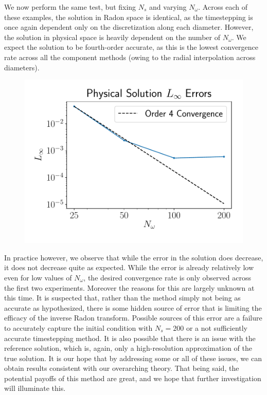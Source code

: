 We now perform the same test, but fixing $N_s$ and varying $N_\omega$.
Across each of these examples, the solution in Radon space is identical, as the timestepping is once again dependent only on the discretization along each diameter.
However, the solution in physical space is heavily dependent on the number of $N_\omega$.
We expect the solution to be fourth-order accurate, as this is the lowest convergence rate across all the component methods (owing to the radial interpolation across diameters).
\begin{center}
\begin{figure}[H]
	\centering
    \includegraphics[height=0.35\linewidth]{figures/Convergence_Physical_Errors_Nw.pdf}
\end{figure}
\end{center}
In practice however, we observe that while the error in the solution does decrease, it does not decrease quite as expected.
While the error is already relatively low even for low values of $N_\omega$, the desired convergence rate is only observed across the first two experiments.
Moreover the reasons for this are largely unknown at this time.
It is suspected that, rather than the method simply not being as accurate as hypothesized, there is some hidden source of error that is limiting the efficacy of the inverse Radon transform.
Possible sources of this error are a failure to accurately capture the initial condition with $N_s=200$ or a not sufficiently accurate timestepping method.
It is also possible that there is an issue with the reference solution, which is, again, only a high-resolution approximation of the true solution.
It is our hope that by addressing some or all of these issues, we can obtain results consistent with our overarching theory.
That being said, the potential payoffs of this method are great, and we hope that further investigation will illuminate this.